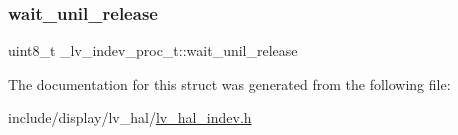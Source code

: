 \subsubsection{\texorpdfstring{wait\_unil\_release}{wait\_unil\_release}}
{\footnotesize\ttfamily uint8\+\_\+t \+\_\+lv\+\_\+indev\+\_\+proc\+\_\+t\+::wait\+\_\+unil\+\_\+release}



The documentation for this struct was generated from the following file\+:\begin{DoxyCompactItemize}
\item 
include/display/lv\+\_\+hal/\mbox{\hyperlink{lv__hal__indev_8h}{lv\+\_\+hal\+\_\+indev.\+h}}\end{DoxyCompactItemize}
